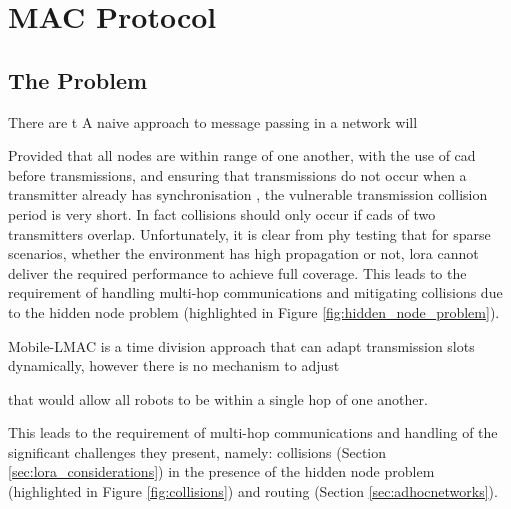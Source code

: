 \chapter{MAC Protocol}
\section{The Problem}
There are t
A naive approach to message passing in a network will 




Provided that all nodes are within range of one another, with the use of \ac{cad} before transmissions, and ensuring that transmissions do not occur when a transmitter already has synchronisation \cite{3YP:LORA_SX12}, the vulnerable transmission collision period is very short. In fact collisions should only occur if \ac{cad}s of two transmitters overlap. Unfortunately, it is clear from \ac{phy} testing that for sparse scenarios, whether the environment has high propagation or not, \ac{lora} cannot deliver the required performance to achieve full coverage. This leads to the requirement of handling multi-hop communications and mitigating collisions due to the hidden node problem (highlighted in Figure \ref{fig:hidden_node_problem}).

Mobile-LMAC is a time division approach that can adapt transmission slots dynamically, however there is no mechanism to adjust 

 that would allow all robots to be within a single hop of one another. 


This leads to the requirement of multi-hop communications and handling of the significant challenges they present, namely: collisions (Section \ref{sec:lora_considerations}) in the presence of the hidden node problem (highlighted in Figure \ref{fig:collisions}) and routing (Section \ref{sec:adhocnetworks}). 


